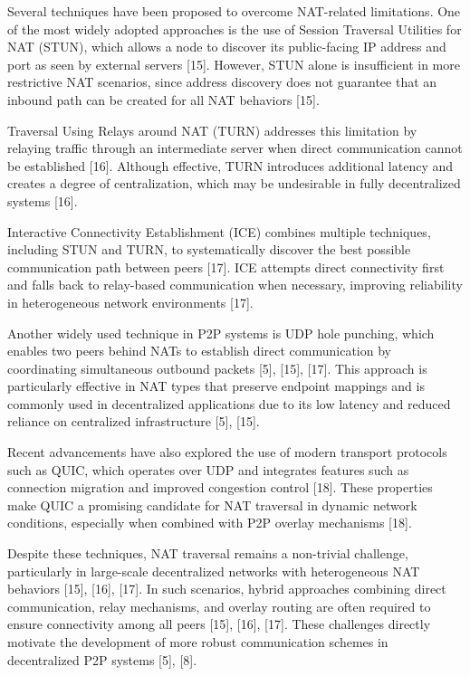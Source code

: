 \documentclass[12pt,a4paper]{article}
\begin{document}
Several techniques have been proposed to overcome NAT-related limitations. One of the most widely adopted approaches is the use of Session Traversal Utilities for NAT (STUN), which allows a node to discover its public-facing IP address and port as seen by external servers [15]. However, STUN alone is insufficient in more restrictive NAT scenarios, since address discovery does not guarantee that an inbound path can be created for all NAT behaviors [15].

Traversal Using Relays around NAT (TURN) addresses this limitation by relaying traffic through an intermediate server when direct communication cannot be established [16]. Although effective, TURN introduces additional latency and creates a degree of centralization, which may be undesirable in fully decentralized systems [16].

Interactive Connectivity Establishment (ICE) combines multiple techniques, including STUN and TURN, to systematically discover the best possible communication path between peers [17]. ICE attempts direct connectivity first and falls back to relay-based communication when necessary, improving reliability in heterogeneous network environments [17].

Another widely used technique in P2P systems is UDP hole punching, which enables two peers behind NATs to establish direct communication by coordinating simultaneous outbound packets [5], [15], [17]. This approach is particularly effective in NAT types that preserve endpoint mappings and is commonly used in decentralized applications due to its low latency and reduced reliance on centralized infrastructure [5], [15].

Recent advancements have also explored the use of modern transport protocols such as QUIC, which operates over UDP and integrates features such as connection migration and improved congestion control [18]. These properties make QUIC a promising candidate for NAT traversal in dynamic network conditions, especially when combined with P2P overlay mechanisms [18].

Despite these techniques, NAT traversal remains a non-trivial challenge, particularly in large-scale decentralized networks with heterogeneous NAT behaviors [15], [16], [17]. In such scenarios, hybrid approaches combining direct communication, relay mechanisms, and overlay routing are often required to ensure connectivity among all peers [15], [16], [17]. These challenges directly motivate the development of more robust communication schemes in decentralized P2P systems [5], [8].
\end{document}
